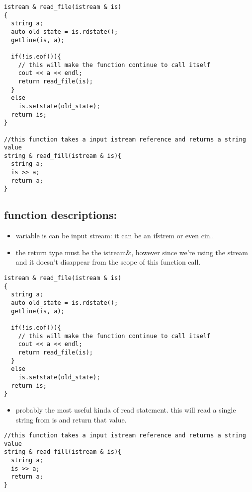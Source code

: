 \documentclass[11pt]{article}
\begin{document}
\begin{verbatim}
istream & read_file(istream & is)
{
  string a;
  auto old_state = is.rdstate();
  getline(is, a);

  if(!is.eof()){
    // this will make the function continue to call itself
    cout << a << endl;
    return read_file(is);
  }
  else
    is.setstate(old_state);
  return is;
}

//this function takes a input istream reference and returns a string value
string & read_fill(istream & is){
  string a;
  is >> a;
  return a;
}
\end{verbatim}
\subsection{function descriptions:}
\label{sec:org6ae95fc}
\begin{itemize}
\item variable is can be input stream: it can be an ifstrem or even cin..
\item the return type must be the istream\&, however since we're using the stream and
it doesn't disappear from the scope of this function call.
\end{itemize}
\begin{verbatim}
istream & read_file(istream & is)
{
  string a;
  auto old_state = is.rdstate();
  getline(is, a);

  if(!is.eof()){
    // this will make the function continue to call itself
    cout << a << endl;
    return read_file(is);
  }
  else
    is.setstate(old_state);
  return is;
}
\end{verbatim}

\begin{itemize}
\item probably the most useful kinda of read statement. this will read a single
string from is and return that value.
\end{itemize}
\begin{verbatim}
//this function takes a input istream reference and returns a string value
string & read_fill(istream & is){
  string a;
  is >> a;
  return a;
}
\end{verbatim}
\end{document}
